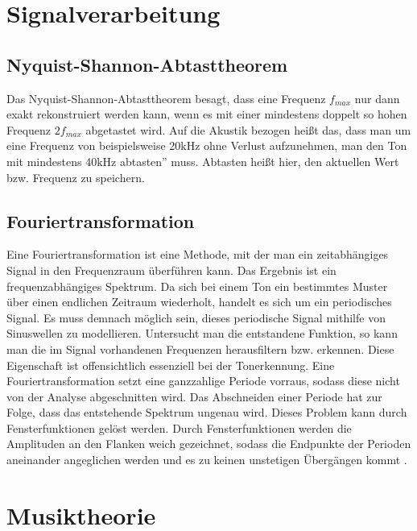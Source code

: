 \section{Signalverarbeitung}
\subsection*{Nyquist-Shannon-Abtasttheorem}
\label{sec:Abtast}
Das Nyquist-Shannon-Abtasttheorem besagt, dass eine Frequenz $f_{max}$ nur dann exakt rekonstruiert werden kann, wenn es mit einer mindestens doppelt so hohen Frequenz $2f_{max}$ abgetastet wird. Auf die Akustik bezogen heißt das, dass man um eine Frequenz von beispielsweise 20kHz ohne Verlust aufzunehmen, man den Ton mit mindestens 40kHz \glqq abtasten'' muss. Abtasten heißt hier, den aktuellen Wert bzw. Frequenz zu speichern. 

\subsection*{Fouriertransformation}
\label{sec:Fouriertransformation}
Eine Fouriertransformation ist eine Methode, mit der man ein zeitabhängiges Signal in den Frequenzraum überführen kann. Das Ergebnis ist ein frequenzabhängiges Spektrum.
Da sich bei einem Ton ein bestimmtes Muster über einen endlichen Zeitraum wiederholt, handelt es sich um ein periodisches Signal. Es muss demnach möglich sein, dieses periodische Signal mithilfe von Sinuswellen zu modellieren. Untersucht man die entstandene Funktion, so kann man die im Signal vorhandenen Frequenzen herausfiltern bzw. erkennen. Diese Eigenschaft ist offensichtlich essenziell bei der Tonerkennung. Eine Fouriertransformation setzt eine ganzzahlige Periode vorraus, sodass diese nicht von der Analyse abgeschnitten wird. Das Abschneiden einer Periode hat zur Folge, dass das entstehende Spektrum ungenau wird.
Dieses Problem kann durch Fensterfunktionen gelöst werden. Durch Fensterfunktionen werden die Amplituden an den Flanken weich gezeichnet, sodass die Endpunkte der Perioden aneinander angeglichen werden und es zu keinen unstetigen Übergängen kommt \cite{Butz2006}.

\section{Musiktheorie}
